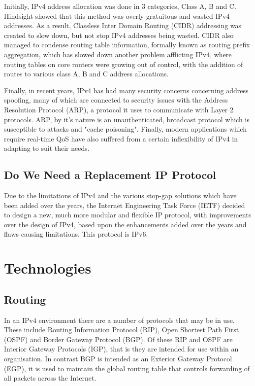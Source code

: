 \documentclass[a4paper,12pt]{article}
\begin{document}
Initially, IPv4 address allocation was done in 3 categories, Class A, B
and C. Hindsight showed that this method was overly gratuitous and
wasted IPv4 addresses. As a result, Classless Inter Domain Routing
(CIDR) addressing was created to slow down, but not stop IPv4 addresses
being wasted. CIDR also managed to condense routing table information,
formally known as routing prefix aggregation, which has slowed down 
another problem afflicting IPv4, where routing tables on core
routers were growing out of control, with the addition of routes to
various class A, B and C address allocations.


Finally, in recent years, IPv4 has had many security concerns concerning
address spoofing, many of which are connected to security issues with
the Address Resolution Protocol (ARP), a protocol it uses to communicate
with Layer 2 protocols. ARP, by it's nature is an unauthenticated, 
broadcast protocol which is susceptible to attacks and "cache poisoning".
Finally, modern applications which require real-time QoS have also 
suffered from a certain inflexibility of IPv4 in adapting to suit their 
needs.

\subsection{Do We Need a Replacement IP Protocol}

Due to the limitations of IPv4 and the various stop-gap solutions which
have been added over the years, the Internet Engineering Task Force
(IETF) decided to design a new, much more modular and flexible IP
protocol, with improvements over the design of IPv4, based upon the
enhancements added over the years and flaws causing limitations. This
protocol is IPv6.

\section{Technologies}

\subsection{Routing}

In an IPv4 environment there are a number of protocols that may be in use. These
include Routing Information Protocol (RIP), Open Shortest Path First (OSPF) and
Border Gateway Protocol (BGP). Of these RIP and OSPF are Interior Gateway
Protocols (IGP), that is they are intended for use within an organisation. In
contrast BGP is intended as an Exterior Gateway Protocol (EGP), it is used to
maintain the global routing table that controls forwarding of all packets
across the Internet.
\end{document}
